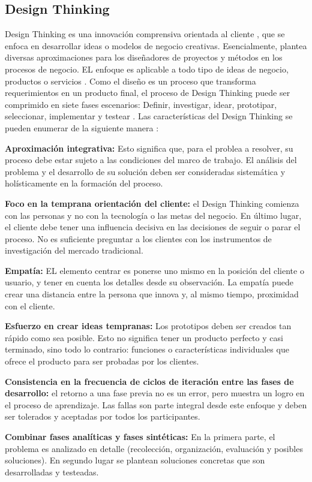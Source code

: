 \subsection{Design Thinking}

Design Thinking es una innovación comprensiva orientada al cliente , que se enfoca en desarrollar ideas o modelos de negocio creativas. Esencialmente, plantea diversas aproximaciones para los diseñadores de proyectos y métodos en los procesos de negocio. EL enfoque es aplicable a todo tipo de ideas de negocio, productos o servicios \citep{mueller2018}. Como el diseño es un proceso que transforma requerimientos en un producto final, el proceso de Design Thinking puede ser comprimido en siete fases escenarios: Definir, investigar, idear, prototipar, seleccionar, implementar y testear \citep{ambrose2010}. Las características del Design Thinking se pueden enumerar de la siguiente manera \citep{mueller2018}:

\begin{description}
\item \textbf{Aproximación integrativa:} Esto significa que, para el problea a resolver, su proceso debe estar sujeto a las condiciones del marco de trabajo. El análisis del problema y el desarrollo de su solución deben ser consideradas sistemática y holísticamente en la formación del proceso. 
\item \textbf{Foco en la temprana orientación del cliente:} el Design Thinking comienza con las personas y no con la tecnología o las metas del negocio. En último lugar, el cliente debe tener una influencia decisiva en las decisiones de seguir o parar el proceso. No es suficiente preguntar a los clientes con los instrumentos de investigación del mercado tradicional.
\item \textbf{Empatía:} EL elemento centrar es ponerse uno mismo en la posición del cliente o usuario, y tener en cuenta los detalles desde su observación. La empatía puede crear una distancia entre la persona que innova y, al mismo tiempo, proximidad con el cliente.
\item \textbf{Esfuerzo en crear ideas tempranas:} Los prototipos deben ser creados tan rápido como sea posible. Esto no significa tener un producto perfecto y casi terminado, sino todo lo contrario: funciones o características individuales que ofrece el producto para ser probadas por los clientes.
\item \textbf{Consistencia en la frecuencia de ciclos de iteración entre las fases de desarrollo:} el retorno a una fase previa no es un error, pero muestra un logro en el proceso de aprendizaje. Las fallas son parte integral desde este enfoque y deben ser tolerados y aceptadas por todos los participantes.
\item \textbf{Combinar fases analíticas y fases sintéticas:} En la primera parte, el problema es analizado en detalle (recolección, organización, evaluación y posibles soluciones). En segundo lugar se plantean soluciones concretas que son desarrolladas y testeadas.
\end{description}


